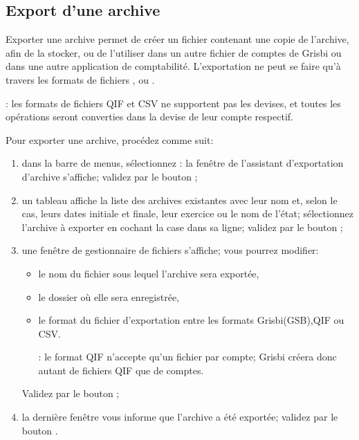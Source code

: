 \subsection{Export d'une archive\label{datamanagement-archive-export}}

Exporter une archive permet de créer un fichier contenant une copie de l'archive, afin de la stocker, ou de l'utiliser dans un autre fichier de comptes de Grisbi ou dans une autre application de comptabilité. L'exportation ne peut se faire qu'à travers les formats de fichiers ,  ou .

\Attention{}: les formats de fichiers QIF et CSV ne supportent pas les devises, et toutes les opérations seront converties dans la devise de leur compte respectif.

Pour exporter une archive, procédez comme suit:

\begin{enumerate}
	\item dans la barre de menus, sélectionnez : la fenêtre de l'assistant d'exportation d'archive s'affiche; validez par le bouton ;
	\item un tableau affiche la liste des archives existantes avec leur nom et, selon le cas, leurs dates initiale et finale, leur exercice ou le nom de l'état; sélectionnez l'archive à exporter en cochant la case dans sa ligne; validez par le bouton ;
	\item une fenêtre de gestionnaire de fichiers s'affiche; vous pourrez modifier:
		\begin{itemize}
			\item le nom du fichier sous lequel l'archive sera exportée,
			\item le dossier où elle sera enregistrée,
			\item le format du fichier d'exportation entre les formats Grisbi(GSB),QIF ou CSV.
			
			\Note{}: le format QIF n'accepte qu'un fichier par compte; Grisbi créera donc autant de fichiers QIF que de comptes.
		\end{itemize}   
	 Validez par le bouton ;
	\item la dernière fenêtre vous informe que l'archive a été exportée; validez par le bouton .
\end{enumerate}
